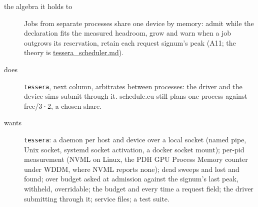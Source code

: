 \begin{description}
\item[{the algebra it holds to}] Jobs from separate processes share one device by memory: admit while the declaration fits the measured headroom, grow and warn when a job outgrows its reservation, retain each request signum's peak (A11; the theory is \hyperref[chap:tessera-scheduler]{tessera\_\allowbreak{}scheduler.md}).
\item[{does}] \texttt{tessera}, next column, arbitrates between processes: the driver and the device sims submit through it. schedule.cu still plans one process against free/3·2, a chosen share.
\item[{wants}] \texttt{tessera}: a daemon per host and device over a local socket (named pipe, Unix socket, systemd socket activation, a docker socket mount); per-pid measurement (NVML on Linux, the PDH GPU Process Memory counter under WDDM, where NVML reports none); dead sweeps and lost and found; over budget asked at admission against the signum's last peak, withheld, overridable; the budget and every time a request field; the driver submitting through it; service files; a test suite.

\end{description}

